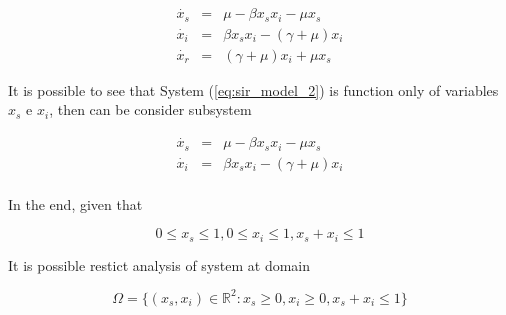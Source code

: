 \begin{equation}
\label{eq:sir_model_2}
    \begin{array}{ccc}
         \dot{x_s} &=&\mu - \beta x_sx_i - \mu x_s\\
         \dot{x_i} &=&\beta x_sx_i - (\gamma + \mu)x_i\\
         \dot{x_r} &=&(\gamma + \mu) x_i + \mu x_s
    \end{array}
\end{equation}

It is possible to see that System (\ref{eq:sir_model_2}) is function only of variables $x_s$ e $x_i$, then can be consider subsystem

\begin{equation}
\label{eq:sir_model_3}
    \begin{array}{ccc}
         \dot{x_s} &=&\mu - \beta x_sx_i - \mu x_s\\
         \dot{x_i} &=&\beta x_sx_i - (\gamma + \mu)x_i\\
    \end{array}
\end{equation}

In the end, given that

\begin{equation}
    0 \leq x_s \leq 1, 0 \leq x_i \leq 1, x_s + x_i \leq 1
\end{equation}

It is possible restict analysis of system at domain

\begin{equation}
    \label{eq:roi}
    \Omega = \{ (x_s,x_i) \in \mathbb{R}^2 : x_s \geq 0, x_i \geq 0, x_s + x_i \leq 1 \}
\end{equation}